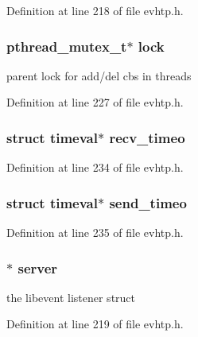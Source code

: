 Definition at line 218 of file evhtp.h.

\hypertarget{structevhtp__s_a33586b4184d23f2b8f4df153ec23af13}{
\subsubsection[{lock}]{\setlength{\rightskip}{0pt plus 5cm}pthread\_\-mutex\_\-t$\ast$ {\bf lock}}}
\label{structevhtp__s_a33586b4184d23f2b8f4df153ec23af13}
parent lock for add/del cbs in threads 

Definition at line 227 of file evhtp.h.

\hypertarget{structevhtp__s_a20c86a275c0f940d56da7353e6d08264}{
\subsubsection[{recv\_\-timeo}]{\setlength{\rightskip}{0pt plus 5cm}struct timeval$\ast$ {\bf recv\_\-timeo}}}
\label{structevhtp__s_a20c86a275c0f940d56da7353e6d08264}


Definition at line 234 of file evhtp.h.

\hypertarget{structevhtp__s_ad997ef3d1566543f53f87120698c9ef4}{
\subsubsection[{send\_\-timeo}]{\setlength{\rightskip}{0pt plus 5cm}struct timeval$\ast$ {\bf send\_\-timeo}}}
\label{structevhtp__s_ad997ef3d1566543f53f87120698c9ef4}


Definition at line 235 of file evhtp.h.

\hypertarget{structevhtp__s_adbf9415567b9a26229148539d64a5eda}{
\subsubsection[{server}]{$\ast$ {\bf server}}}
\label{structevhtp__s_adbf9415567b9a26229148539d64a5eda}
the libevent listener struct 

Definition at line 219 of file evhtp.h.

